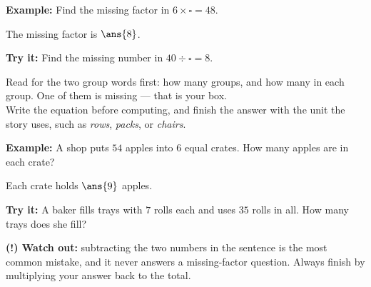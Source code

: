 \documentclass[12pt]{article}
\begin{document}
\begin{examplebox}
\textbf{Example:} Find the missing factor in $6 \times \square = 48$.

The missing factor is $\ans{8}$.
\end{examplebox}

\begin{tryitbox}
\textbf{Try it:} Find the missing number in $40 \div \square = 8$.\\[2pt]
\end{tryitbox}


\begin{formulabox}
Read for the two group words first: how many groups, and how many in each
group. One of them is missing --- that is your box.\\[3pt]
Write the equation before computing, and finish the answer with the unit the
story uses, such as \emph{rows}, \emph{packs}, or \emph{chairs}.
\end{formulabox}

\begin{examplebox}
\textbf{Example:} A shop puts $54$ apples into $6$ equal crates. How many
apples are in each crate?

Each crate holds $\ans{9}$ apples.
\end{examplebox}

\begin{tryitbox}
\textbf{Try it:} A baker fills trays with $7$ rolls each and uses $35$ rolls in
all. How many trays does she fill?\\[2pt]
\end{tryitbox}

\begin{watchoutbox}
\textbf{(!) Watch out:} subtracting the two numbers in the sentence is the most
common mistake, and it never answers a missing-factor question. Always finish
by multiplying your answer back to the total.
\end{watchoutbox}
\end{document}
